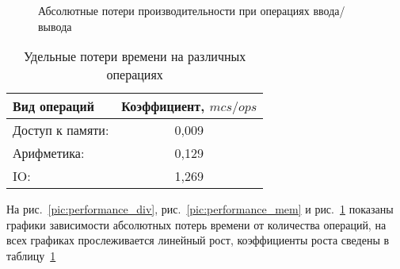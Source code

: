 \begin{figure}[h]
\caption{Абсолютные потери производительности при операциях ввода/вывода}
\label{pic:performance_io}
\end{figure}

\begin{table}[h]
\caption{Удельные потери времени на различных операциях}
\label{tbl:preformance_k}
\begin{center}
    \begin{tabular}{|l|c|}
        \hline
        \textbf{Вид операций} & \textbf{Коэффициент, ${mcs}/{ops}$} \\
        \hline
        Доступ к памяти: & 0,009 \\
        Арифметика:      & 0,129 \\ 
        IO:              & 1,269 \\
        \hline
    \end{tabular}
\end{center}
\end{table}

На рис.~\ref{pic:performance_div}, рис.~\ref{pic:performance_mem} и рис.~\ref{pic:performance_io} показаны графики зависимости абсолютных потерь времени от количества операций, на всех графиках прослеживается линейный рост, коэффициенты роста сведены в таблицу~\ref{tbl:preformance_k}
